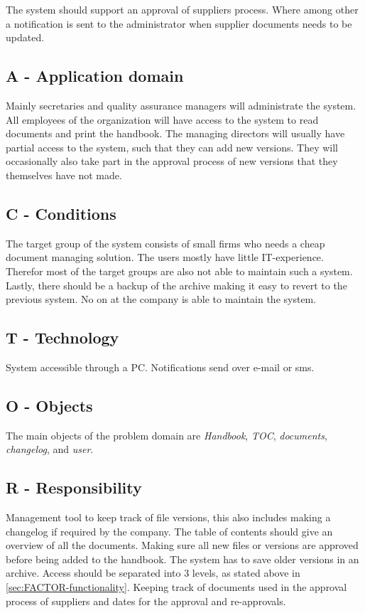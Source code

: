 The system should support an approval of suppliers process.
Where among other a notification is sent to the administrator when supplier documents needs to be updated. 

\subsection{A - Application domain}
Mainly secretaries and quality assurance managers will administrate the system. 
All employees of the organization will have access to the system to read documents and print the handbook. 
The managing directors will usually have partial access to the system, such that they can add new versions. 
They will occasionally also take part in the approval process of new versions that they themselves have not made.

\subsection{C - Conditions}
The target group of the system consists of small firms who needs a cheap document managing solution. 
The users mostly have little IT-experience.
Therefor most of the target groups are also not able to maintain such a system.
Lastly, there should be a backup of the archive making it easy to revert to the previous system.
No on at the company is able to maintain the system.

\subsection{T - Technology}
System accessible through a PC.
Notifications send over e-mail or sms.

\subsection{O - Objects}
The main objects of the problem domain are \textit{Handbook}, \textit{TOC}, \textit{documents}, \textit{changelog}, and \textit{user}.

\subsection{R  - Responsibility}
Management tool to keep track of file versions, this also includes making a changelog if required by the company.
The table of contents should give an overview of all the documents. 
Making sure all new files or versions are approved before being added to the handbook.
The system has to save older versions in an archive. 
Access should be separated into 3 levels, as stated above in \cref{sec:FACTOR-functionality}. 
Keeping track of documents used in the approval process of suppliers and dates for the approval and re-approvals. 



